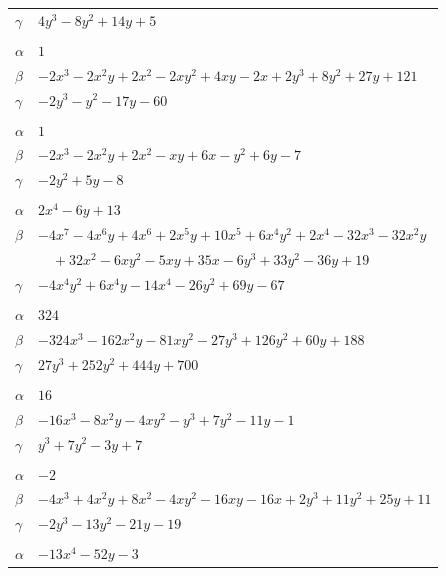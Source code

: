 \documentclass[11pt]{article}
\begin{document}
\begin{longtable}{@{}ll@{}}
$\gamma$ & $4y^{3}-8y^{2}+14y+5$\\
\addlinespace[3pt]
\multicolumn{2}{@{}l}{$\{i,j\}=\{10,17\}$, $k_{ij}=3^{5}$}\\
$\alpha$ & $1$\\
$\beta$ & $-2x^{3}-2x^{2}y+2x^{2}-2xy^{2}+4xy-2x+2y^{3}+8y^{2}+27y+121$\\
$\gamma$ & $-2y^{3}-y^{2}-17y-60$\\
\addlinespace[3pt]
\multicolumn{2}{@{}l}{$\{i,j\}=\{10,20\}$, $k_{ij}=3$}\\
$\alpha$ & $1$\\
$\beta$ & $-2x^{3}-2x^{2}y+2x^{2}-xy+6x-y^{2}+6y-7$\\
$\gamma$ & $-2y^{2}+5y-8$\\
\addlinespace[3pt]
\multicolumn{2}{@{}l}{$\{i,j\}=\{10,24\}$, $k_{ij}=3^{2}\cdot 5$}\\
$\alpha$ & $2x^{4}-6y+13$\\
$\beta$ & $-4x^{7}-4x^{6}y+4x^{6}+2x^{5}y+10x^{5}+6x^{4}y^{2}+2x^{4}-32x^{3}-32x^{2}y$\\
 & $\quad +32x^{2}-6xy^{2}-5xy+35x-6y^{3}+33y^{2}-36y+19$\\
$\gamma$ & $-4x^{4}y^{2}+6x^{4}y-14x^{4}-26y^{2}+69y-67$\\
\addlinespace[3pt]
\multicolumn{2}{@{}l}{$\{i,j\}=\{11,13\}$, $k_{ij}=2^{11}$}\\
$\alpha$ & $324$\\
$\beta$ & $-324x^{3}-162x^{2}y-81xy^{2}-27y^{3}+126y^{2}+60y+188$\\
$\gamma$ & $27y^{3}+252y^{2}+444y+700$\\
\addlinespace[3pt]
\multicolumn{2}{@{}l}{$\{i,j\}=\{11,16\}$, $k_{ij}=2\cdot 3^{2}$}\\
$\alpha$ & $16$\\
$\beta$ & $-16x^{3}-8x^{2}y-4xy^{2}-y^{3}+7y^{2}-11y-1$\\
$\gamma$ & $y^{3}+7y^{2}-3y+7$\\
\addlinespace[3pt]
\multicolumn{2}{@{}l}{$\{i,j\}=\{12,14\}$, $k_{ij}=2^{2}\cdot 3$}\\
$\alpha$ & $-2$\\
$\beta$ & $-4x^{3}+4x^{2}y+8x^{2}-4xy^{2}-16xy-16x+2y^{3}+11y^{2}+25y+11$\\
$\gamma$ & $-2y^{3}-13y^{2}-21y-19$\\
\addlinespace[3pt]
\multicolumn{2}{@{}l}{$\{i,j\}=\{12,18\}$, $k_{ij}=2^{2}\cdot 3^{3}$}\\
$\alpha$ & $-13x^{4}-52y-3$\\

\end{longtable}
\end{document}
